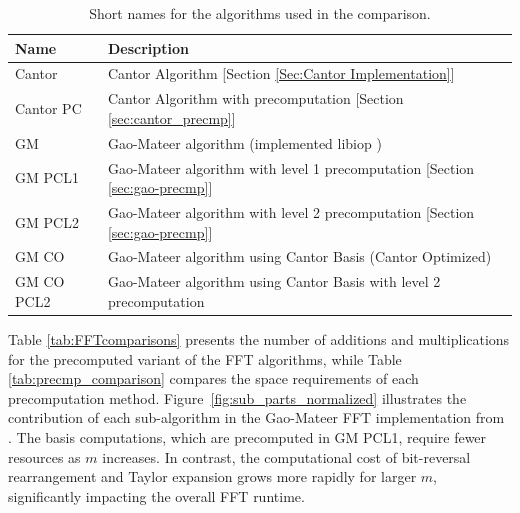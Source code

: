 \begin{table}[h]
	\centering
	\caption{Short names for the algorithms used in the comparison.}
	\setlength{\tabcolsep}{8pt} %
		\begin{tabular}{ll}
			\toprule
			\textbf{Name} & \textbf{Description} \\
			\midrule
			Cantor & Cantor Algorithm  [Section \ref{Sec:Cantor Implementation}]\\
			Cantor PC & Cantor Algorithm with precomputation [Section \ref{sec:cantor_precmp}] \\
			GM & Gao-Mateer algorithm (implemented  libiop \cite{libiop}) \\
			GM PCL1 & Gao-Mateer algorithm with level 1 precomputation [Section \ref{sec:gao-precmp}] \\
			GM PCL2& Gao-Mateer algorithm with level 2 precomputation [Section \ref{sec:gao-precmp}] \\
			GM CO & Gao-Mateer algorithm using Cantor Basis (Cantor Optimized) \\
			GM CO PCL2& Gao-Mateer algorithm using Cantor Basis with level 2 precomputation \\
			\bottomrule
		\end{tabular}
	\label{tab:alg_shortnames}
\end{table}

Table \ref{tab:FFTcomparisons} presents the number of additions and multiplications for the precomputed variant of the FFT algorithms, while Table \ref{tab:precmp_comparison} compares the space requirements of each precomputation method. Figure~\ref{fig:sub_parts_normalized} illustrates the contribution of each sub-algorithm in the Gao-Mateer FFT implementation from \cite{libiop}. The basis computations, which are precomputed in GM PCL1, require fewer resources as \( m \) increases. In contrast, the computational cost of bit-reversal rearrangement and Taylor expansion grows more rapidly for larger \( m \), significantly impacting the overall FFT runtime.


